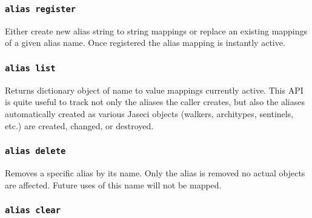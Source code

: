\subsubsection{\lstinline[basicstyle=\Large\ttfamily]$alias register$}

{Either create new alias string to string mappings or replace
an existing mappings of a given alias name. Once registered the
alias mapping is instantly active.\vspace{4mm}\par
{}}
\subsubsection{\lstinline[basicstyle=\Large\ttfamily]$alias list$}

{Returns dictionary object of name to value mappings currently active.
This API is quite useful to track not only the aliases the caller
creates, but also the aliases automatically created as various Jaseci
objects (walkers, architypes, sentinels, etc.) are created, changed,
or destroyed.}
\subsubsection{\lstinline[basicstyle=\Large\ttfamily]$alias delete$}

{Removes a specific alias by its name. Only the alias is removed no
actual objects are affected. Future uses of this name will not be
mapped.\vspace{4mm}\par
{}}
\subsubsection{\lstinline[basicstyle=\Large\ttfamily]$alias clear$}

